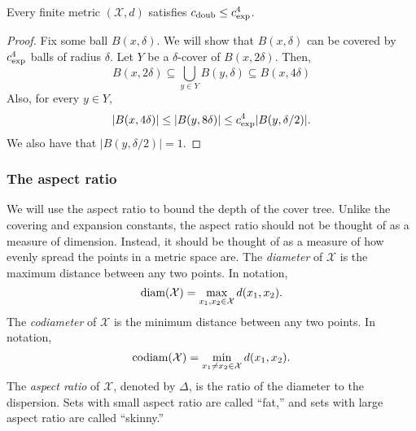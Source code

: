 \documentclass[../main.tex]{subfiles}
\newcommand{\set}[1]{\mathcal {#1}}
\newcommand{\dist}[2]{\distf({#1},{#2})}
\newcommand{\distf}{d}
\newcommand{\diam}[1]{\textnormal{diam}({#1})}
\newcommand{\codiam}[1]{\textnormal{codiam}({#1})}
\newcommand{\aspect}[1]{\Delta}
\newcommand{\krdim}{\text{dim}_\textnormal{exp}}
\newcommand{\doubdim}{\text{dim}_\textnormal{doub}}
\newcommand{\krnum}{c_\textnormal{exp}}
\newcommand{\doubnum}{c_\textnormal{doub}}
\begin{document}
\begin{lemma}
    Every finite metric $(\set X,d)$ satisfies
    $\doubnum \le \krnum^4$.
\end{lemma}
\begin{proof}
    Fix some ball $B(x,\delta)$.
    We will show that $B(x,\delta)$ can be covered by $\krnum^4$ balls of radius $\delta$.
    Let $Y$ be a $\delta$-cover of $B(x,2\delta)$.
    Then,
    \begin{equation}
        B(x,2\delta) 
        \subseteq 
        \bigcup\limits_{y\in Y} B(y,\delta) 
        \subseteq
        B(x,4\delta)
    \end{equation}
    Also, for every $y\in Y$,
    \begin{equation}
        |B(x,4\delta)| 
        \le 
        |B(y,8\delta)| 
        \le 
        \krnum^4 |B(y,\delta/2)|
        .
    \end{equation}
    We also have that $|B(y,\delta/2)|=1$.
\end{proof}


\subsubsection{The aspect ratio}

We will use the aspect ratio to bound the depth of the cover tree.
Unlike the covering and expansion constants,
the aspect ratio should not be thought of as a measure of dimension.
Instead, it should be thought of as a measure of how evenly spread the points in a metric space are.
The \emph{diameter} of $\set X$ is the maximum distance between any two points.
In notation,
\begin{equation}
    \diam {\set X} = \max_{x_1,x_2\in\set X} \dist{x_1}{x_2}
    .
\end{equation}
The \emph{codiameter} of $\set X$ is the minimum distance between any two points.
In notation,
\begin{equation}
    \codiam {\set X} = \min_{x_1 \ne x_2\in\set X} \dist{x_1}{x_2}
    .
\end{equation}
The \emph{aspect ratio} of $\set X$, denoted by $\aspect{\set X}$, 
is the ratio of the diameter to the dispersion.
Sets with small aspect ratio are called ``fat,''
and sets with large aspect ratio are called ``skinny.''
\end{document}
